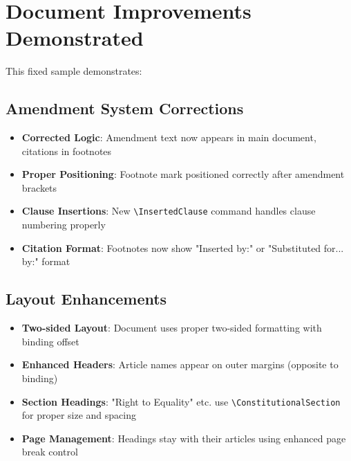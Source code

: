 \documentclass[showamendments,twoside]{soi}
\begin{document}
\tableofcontents
\clearpage










\clearpage
\appendix


\clearpage
\section*{Document Improvements Demonstrated}

This fixed sample demonstrates:

\subsection*{Amendment System Corrections}
\begin{itemize}
\item \textbf{Corrected Logic}: Amendment text now appears in main document, citations in footnotes
\item \textbf{Proper Positioning}: Footnote mark positioned correctly after amendment brackets
\item \textbf{Clause Insertions}: New \texttt{\textbackslash{}InsertedClause} command handles clause numbering properly
\item \textbf{Citation Format}: Footnotes now show "Inserted by:" or "Substituted for... by:" format
\end{itemize}

\subsection*{Layout Enhancements}
\begin{itemize}
\item \textbf{Two-sided Layout}: Document uses proper two-sided formatting with binding offset
\item \textbf{Enhanced Headers}: Article names appear on outer margins (opposite to binding)
\item \textbf{Section Headings}: "Right to Equality" etc. use \texttt{\textbackslash{}ConstitutionalSection} for proper size and spacing
\item \textbf{Page Management}: Headings stay with their articles using enhanced page break control
\end{itemize}
\end{document}
